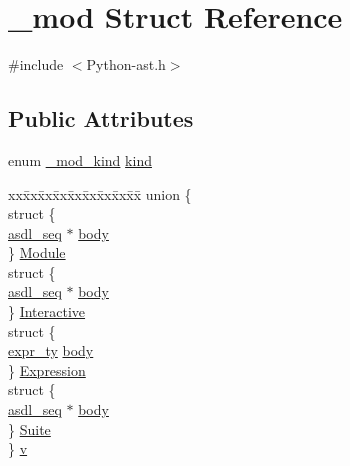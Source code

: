 \hypertarget{struct__mod}{}\section{\+\_\+mod Struct Reference}
\label{struct__mod}


{\ttfamily \#include $<$Python-\/ast.\+h$>$}

\subsection*{Public Attributes}
\begin{DoxyCompactItemize}
\item 
enum \mbox{\hyperlink{_python-ast_8h_a8f50e8590be64db9ce87b40df20e1a30}{\+\_\+mod\+\_\+kind}} \mbox{\hyperlink{struct__mod_aa3c9c2b9eed3828cf2bcf8400859dcc0}{kind}}
\item 
\begin{tabbing}
xx\=xx\=xx\=xx\=xx\=xx\=xx\=xx\=xx\=\kill
union \{\\
\>struct \{\\
\>\>\mbox{\hyperlink{structasdl__seq}{asdl\_seq}} $\ast$ \mbox{\hyperlink{struct__mod_acde99fa73078202021e0f0260f5c9e9f}{body}}\\
\>\} \mbox{\hyperlink{struct__mod_aeb7d7e99f444dd61a4ebf79eb4c3caa0}{Module}}\\
\>struct \{\\
\>\>\mbox{\hyperlink{structasdl__seq}{asdl\_seq}} $\ast$ \mbox{\hyperlink{struct__mod_acde99fa73078202021e0f0260f5c9e9f}{body}}\\
\>\} \mbox{\hyperlink{struct__mod_a2ce8299fdd1ac0e49a6d174454a2ac4f}{Interactive}}\\
\>struct \{\\
\>\>\mbox{\hyperlink{_python-ast_8h_a56d3705e020a071405094a220c4592bd}{expr\_ty}} \mbox{\hyperlink{struct__mod_ac5a021a8e168c2a2939813068a4fd5c0}{body}}\\
\>\} \mbox{\hyperlink{struct__mod_aee4cce823d4f7edd28b4a3394c082346}{Expression}}\\
\>struct \{\\
\>\>\mbox{\hyperlink{structasdl__seq}{asdl\_seq}} $\ast$ \mbox{\hyperlink{struct__mod_acde99fa73078202021e0f0260f5c9e9f}{body}}\\
\>\} \mbox{\hyperlink{struct__mod_a07f136d6ca663aaca74a6924cab6b4d3}{Suite}}\\
\} \mbox{\hyperlink{struct__mod_a58c87fa5dffa02684cff14f446e37f57}{v}}\\

\end{tabbing}\end{DoxyCompactItemize}


